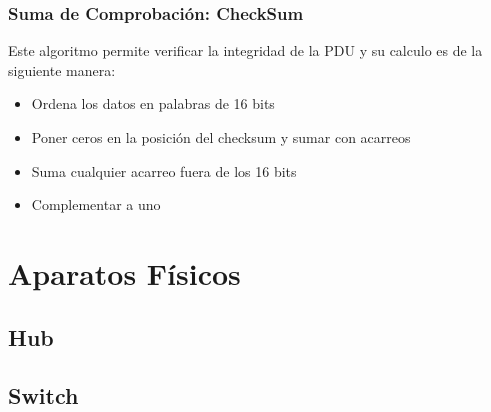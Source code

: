 \documentclass[12pt, fleqn]{report}                             %
\theoremstyle{break}                                            %
\begin{document}
        \section{Suma de Comprobación: CheckSum}

            Este algoritmo permite verificar la integridad de la PDU y su calculo es de la siguiente manera:

            \begin{itemize}
                \item Ordena los datos en palabras de 16 bits
                \item Poner ceros en la posición del checksum y sumar con acarreos
                \item Suma cualquier acarreo fuera de los 16 bits
                \item Complementar a uno
            \end{itemize}

            


\part{Aparatos Físicos}
\clearpage

    
    \chapter{Hub}


    \chapter{Switch}


\end{document}
